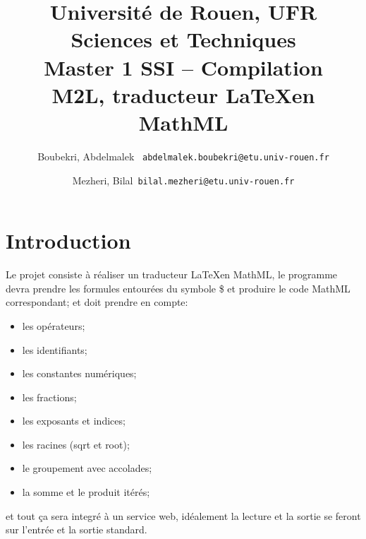 \documentclass[12pt,a4paper]{article}
\author{
	Boubekri, Abdelmalek \     \texttt{abdelmalek.boubekri@etu.univ-rouen.fr}
	\and
	Mezheri, Bilal\   		   \texttt{bilal.mezheri@etu.univ-rouen.fr}
}
\title{	Université de Rouen, UFR Sciences et Techniques\\
		Master 1 SSI – Compilation\\
		M2L, traducteur \LaTeX en MathML\\ }
\begin{document}
	
	\maketitle
	\newpage

\section{Introduction}
Le projet consiste à réaliser un traducteur \LaTeX en MathML, le programme devra prendre les formules entourées du symbole \$ et produire le code MathML correspondant; et doit prendre en compte:
\begin{itemize}
	\item les opérateurs;
	\item les identifiants;
	\item les constantes numériques;
	\item les fractions;
	\item les exposants et indices;
	\item les racines (sqrt et root);
	\item le groupement avec accolades;
	\item la somme et le produit itérés;
\end{itemize}

et tout ça sera integré à un service web, idéalement la lecture et la sortie se feront sur l'entrée et la sortie standard.
\end{document}

